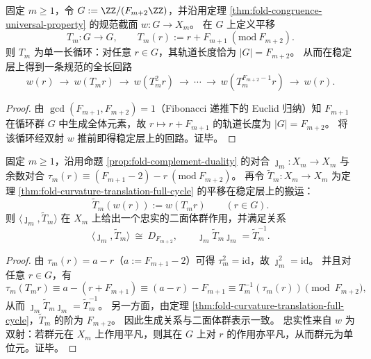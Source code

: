 \begin{theorem}\label{thm:fold-curvature-translation-full-cycle}
固定 \(m\ge 1\)，令 \(G:=\ZZ/(F_{m+2}\ZZ)\)，并沿用定理 \ref{thm:fold-congruence-universal-property} 的规范截面
\(
w:G\to X_m
\)。
在 \(G\) 上定义平移
\[
T_m:G\to G,\qquad T_m(r):=r+F_{m+1}\ (\mathrm{mod}\ F_{m+2}).
\]
则 \(T_m\) 为单一长循环：对任意 \(r\in G\)，其轨道长度恰为 \(|G|=F_{m+2}\)。
从而在稳定层上得到一条规范的全长回路
\[
w(r)\ \to\ w(T_m r)\ \to\ w(T_m^2 r)\ \to\ \cdots\ \to\ w(T_m^{F_{m+2}-1} r)\ \to\ w(r).
\]
\end{theorem}
\begin{proof}
由 \(\gcd(F_{m+1},F_{m+2})=1\)（Fibonacci 递推下的 Euclid 归纳）知 \(F_{m+1}\) 在循环群 \(G\) 中生成全体元素，故 \(r\mapsto r+F_{m+1}\) 的轨道长度为 \(|G|=F_{m+2}\)。
将该循环经双射 \(w\) 推前即得稳定层上的回路。证毕。
\end{proof}

\begin{theorem}[补码对称与曲率平移生成二面体作用]\label{thm:fold-curvature-dihedral-action}
固定 \(m\ge 1\)，沿用命题 \ref{prop:fold-complement-duality} 的对合
\(
\jmath_m:X_m\to X_m
\)
与余数对合 \(\tau_m(r)\equiv (F_{m+1}-2)-r\ (\mathrm{mod}\ F_{m+2})\)。
再令 \(\widetilde T_m:X_m\to X_m\) 为定理 \ref{thm:fold-curvature-translation-full-cycle} 的平移在稳定层上的搬运：
\[
\widetilde T_m(w(r)):=w(T_m r)\qquad(r\in G).
\]
则 \(\langle \jmath_m,\widetilde T_m\rangle\) 在 \(X_m\) 上给出一个忠实的二面体群作用，并满足关系
\[
\boxed{\;
\langle \jmath_m,\widetilde T_m\rangle\ \cong\ D_{F_{m+2}},
\qquad
\jmath_m\widetilde T_m\jmath_m=\widetilde T_m^{-1}. \;}
\]
\end{theorem}
\begin{proof}
由 \(\tau_m(r)=a-r\)（\(a:=F_{m+1}-2\)）可得 \(\tau_m^2=\mathrm{id}\)，故 \(\jmath_m^2=\mathrm{id}\)。
并且对任意 \(r\in G\)，有
\[
\tau_m(T_m r)\equiv a-(r+F_{m+1})\equiv (a-r)-F_{m+1}\equiv T_m^{-1}(\tau_m(r))\pmod{F_{m+2}},
\]
从而
\(
\jmath_m\widetilde T_m\jmath_m=\widetilde T_m^{-1}
\)。
另一方面，由定理 \ref{thm:fold-curvature-translation-full-cycle}，\(\widetilde T_m\) 的阶为 \(F_{m+2}\)。
因此生成关系与二面体群表示一致。
忠实性来自 \(w\) 为双射：若群元在 \(X_m\) 上作用平凡，则其在 \(G\) 上对 \(r\) 的作用亦平凡，从而群元为单位元。证毕。
\end{proof}

\endinput
